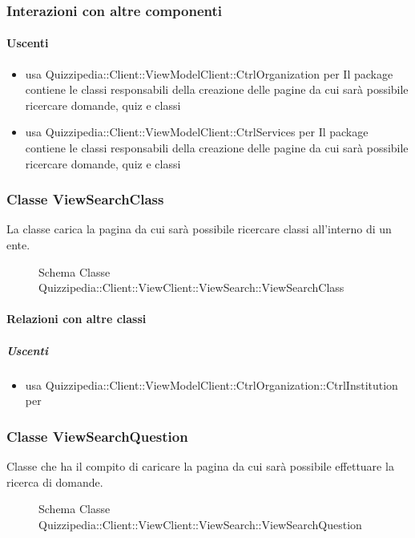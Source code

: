 \subsubsection{Interazioni con altre componenti}
\paragraph{Uscenti}
\begin{itemize}
\item usa Quizzipedia::Client::ViewModelClient::CtrlOrganization per Il package contiene le classi responsabili della creazione delle pagine da cui sarà possibile ricercare domande, quiz e classi 
\item usa Quizzipedia::Client::ViewModelClient::CtrlServices per Il package contiene le classi responsabili della creazione delle pagine da cui sarà possibile ricercare domande, quiz e classi 
\end{itemize}
\subsubsection{Classe ViewSearchClass}
La classe carica la pagina da cui sarà possibile ricercare classi all'interno di un ente.
\begin{figure}[H]
\centering
\noindent{}
\caption[Schema Classe ViewSearchClass]{Schema Classe Quizzipedia::Client::ViewClient::ViewSearch::ViewSearchClass}
\end{figure}
\paragraph{Relazioni con altre classi}
\subparagraph{Uscenti}
\begin{itemize}
\item usa Quizzipedia::Client::ViewModelClient::CtrlOrganization::CtrlInstitution per 
\end{itemize}
\subsubsection{Classe ViewSearchQuestion}
Classe che ha il compito di caricare la pagina da cui sarà possibile effettuare la ricerca di domande.
\begin{figure}[H]
\centering
\noindent{}
\caption[Schema Classe ViewSearchQuestion]{Schema Classe Quizzipedia::Client::ViewClient::ViewSearch::ViewSearchQuestion}
\end{figure}

